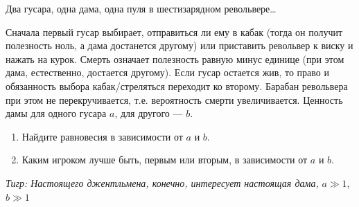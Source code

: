 \begin{problem}

Два гусара, одна дама, одна пуля в шестизарядном револьвере\ldots

Сначала первый гусар выбирает, отправиться ли ему в кабак (тогда он получит полезность ноль, а дама достанется другому) или приставить револьвер к виску и нажать на курок. Смерть означает полезность равную минус единице (при этом дама, естественно, достается другому). Если гусар остается жив, то право и обязанность выбора кабак/стреляться переходит ко второму. Барабан револьвера при этом не перекручивается, т.е. вероятность смерти увеличивается. Ценность дамы для одного гусара  $a$, для другого ---  $b$.

\begin{enumerate}
\item  Найдите равновесия в зависимости от  $a$  и  $b$.

\item Каким игроком лучше быть, первым или вторым, в зависимости от   $a$  и  $b$.
\end{enumerate}
{\it Тигр: Настоящего джентльмена, конечно, интересует настоящая дама, } $a\gg 1$, $b\gg 1$




\end{problem}

